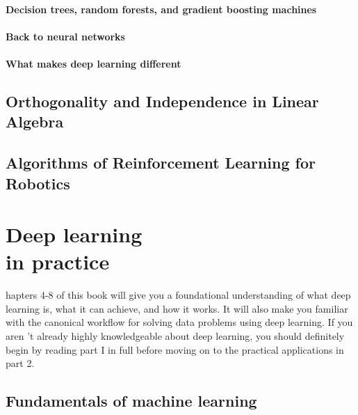 \documentclass[a4paper,twoside,openany]{book}
\begin{document}
		\subsection{Decision trees, random forests, and gradient boosting machines}
		\subsection{Back to neural networks} 
		\subsection{What makes deep learning different}

	\chapter{Orthogonality and Independence in Linear Algebra}
	\chapter{Algorithms of Reinforcement Learning for Robotics}
	
	\part[DEEP LEARNINF IN PRACTICE]{Deep learning \\ in practice}	
	\thispagestyle{empty}
	
	\begin{spacing}{1.3}
	hapters 4-8 of this book will give you a foundational 									understanding of what deep learning is, what it can achieve, and how it works. It will also make 		you familiar with the canonical workflow for solving data problems using deep learning. If you 
	aren 't already highly knowledgeable about deep learning, you should definitely begin by reading 		part I in full before moving on to the practical applications in part 2.
	\end{spacing} 
	
	\afterpage{
		\null \thispagestyle{empty} \newpage	
	}
	
	\chapter{Fundamentals of machine learning}
		 
		 
		 
		 
		 
		 
		 
		 
\end{document}
